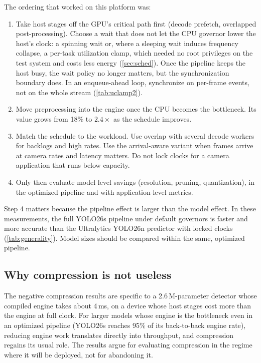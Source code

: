 The ordering that worked on this platform was:
\begin{enumerate}
\item Take host stages off the GPU's critical path first (decode
  prefetch, overlapped post-processing). Choose a wait that does not
  let the CPU governor lower the host's clock: a spinning wait or, where
  a sleeping wait induces frequency collapse, a per-task utilization
  clamp, which needed no root privileges on the test system and costs
  less energy (\cref{sec:sched}). Once the pipeline
  keeps the host busy, the wait policy no longer matters, but the
  synchronization boundary does. In an enqueue-ahead loop, synchronize
  on per-frame events, not on the whole stream (\cref{tab:uclamp2}).
\item Move preprocessing into the engine once the CPU becomes the
  bottleneck. Its value grows from 18\% to $2.4\times$ as the schedule
  improves.
\item Match the schedule to the workload. Use overlap with several
  decode workers for backlogs and high rates. Use the arrival-aware
  variant when frames arrive at camera rates and latency matters. Do
  not lock clocks for a camera application that runs below capacity.
\item Only then evaluate model-level savings (resolution, pruning,
  quantization), in the optimized pipeline and with application-level
  metrics.
\end{enumerate}
Step 4 matters because the pipeline effect is larger than the model
effect. In these measurements, the full YOLO26s pipeline under default
governors is faster and more accurate than the Ultralytics YOLO26n
predictor with locked clocks (\cref{tab:generality}). Model sizes
should be compared within the same, optimized pipeline.

\subsection{Why compression is not useless}

The negative compression results are specific to a 2.6\,M-parameter
detector whose compiled engine takes about 4\,ms, on a device whose
host stages cost more than the engine at full clock. For larger
models whose engine is the bottleneck even in an optimized pipeline
(YOLO26s reaches 95\% of its back-to-back engine rate), reducing engine
work translates directly into throughput, and compression regains its
usual role. The results argue for evaluating compression in the regime
where it will be deployed, not for abandoning it.

